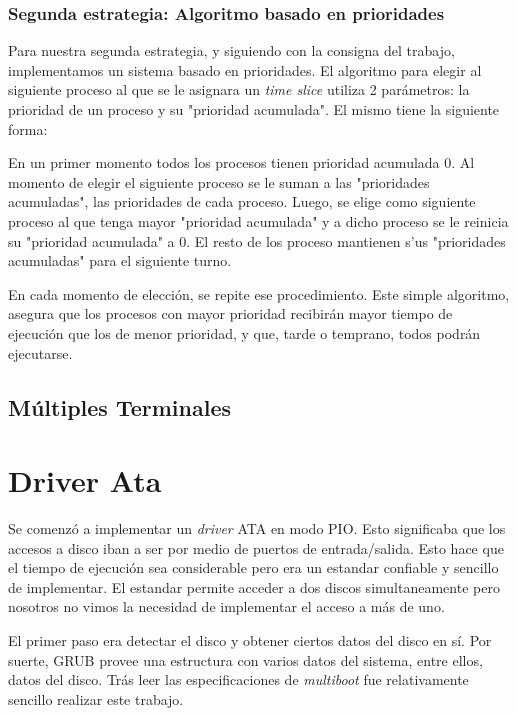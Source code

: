 \documentclass[a4paper,10pt]{article}
\begin{document}
        \subsubsection{Segunda estrategia: Algoritmo basado en prioridades}
        Para nuestra segunda estrategia, y siguiendo con la consigna del trabajo, implementamos un sistema basado en 
        prioridades. El algoritmo para elegir al siguiente proceso al que se le asignara un \textit{time slice} utiliza
        2 parámetros: la prioridad de un proceso y su "prioridad acumulada". El mismo tiene la siguiente forma:

        En un primer momento todos los procesos tienen prioridad acumulada 0. Al momento de elegir el siguiente proceso
        se le suman a las "prioridades acumuladas", las prioridades de cada proceso. Luego, se elige como siguiente 
        proceso al que tenga mayor "prioridad acumulada" y a dicho proceso se le reinicia su "prioridad acumulada" a 0.
        El resto de los proceso mantienen s'us "prioridades acumuladas" para el siguiente turno. 

        En cada momento de elección, se repite ese procedimiento. Este simple algoritmo, asegura que los procesos con 
        mayor prioridad recibirán mayor tiempo de ejecución que los de menor prioridad, y que, tarde o temprano, todos
        podrán ejecutarse.

    \subsection{Múltiples Terminales}
\newpage
\section{Driver Ata}
    Se comenzó a implementar un \textit{driver} ATA en modo PIO. Esto significaba que los accesos a disco iban a ser
    por medio de puertos de entrada/salida. Esto hace que el tiempo de ejecución sea considerable pero era un estandar
    confiable y sencillo de implementar.
    El estandar permite acceder a dos discos simultaneamente pero nosotros no vimos la necesidad de implementar el 
    acceso a más de uno.
    
    El primer paso era detectar el disco y obtener ciertos datos del disco en sí. Por suerte, GRUB provee una estructura
    con varios datos del sistema, entre ellos, datos del disco. Trás leer las especificaciones de \textit{multiboot}
    fue relativamente sencillo realizar este trabajo.
\end{document}
